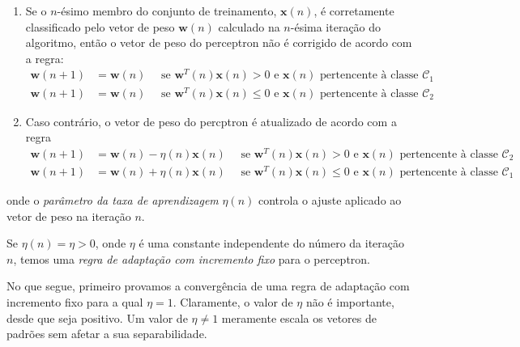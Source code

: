 \begin{enumerate}
  \item Se o $n$-ésimo membro do conjunto de treinamento, $\textbf{x}(n)$, é corretamente classificado pelo vetor de peso $\textbf{w}(n)$ calculado na $n$-ésima iteração do algoritmo, então o vetor de peso do perceptron não é corrigido de acordo com a regra:
  \begin{equation}
    \begin{aligned} \label{sec:perceptron:alg1}
      \textbf{w}(n+1) &= \textbf{w}(n)\quad \text{ se $\textbf{w}^T(n)\textbf{x}(n) > 0 $ e $\textbf{x}(n)$ pertencente à classe  $\mathscr{C}_1$} \\
      \textbf{w}(n+1) &= \textbf{w}(n)\quad \text{ se $\textbf{w}^T(n)\textbf{x}(n) \leq 0 $ e $\textbf{x}(n)$ pertencente à classe  $\mathscr{C}_2$} 
    \end{aligned}
  \end{equation}
  \item Caso contrário, o vetor de peso do percptron é atualizado de acordo com a regra
    \begin{equation}
      \begin{aligned} \label{sec:perceptron:alg2}
        \textbf{w}(n+1) &= \textbf{w}(n) - \eta (n)\textbf{x}(n)\quad \text{ se $\textbf{w}^T(n)\textbf{x}(n) > 0 $ e $\textbf{x}(n)$ pertencente à classe  $\mathscr{C}_2$} \\
        \textbf{w}(n+1) &= \textbf{w}(n) + \eta (n)\textbf{x}(n)\quad \text{ se $\textbf{w}^T(n)\textbf{x}(n) \leq 0 $ e $\textbf{x}(n)$ pertencente à classe  $\mathscr{C}_1$} 
      \end{aligned}
    \end{equation}
\end{enumerate}
onde o \textit{parâmetro da taxa de aprendizagem} $\eta (n)$ controla o ajuste aplicado ao vetor de peso na iteração $n$.

\noindent
Se $\eta(n)=\eta>0$, onde $\eta$ é uma constante independente do número da iteração $n$, temos uma \textit{regra de adaptação com incremento fixo} para o perceptron.

No que segue, primeiro provamos a convergência de uma regra de adaptação com incremento fixo para a qual $\eta=1$. Claramente, o valor de $\eta$ não é importante, desde que seja positivo. Um valor de $\eta \neq 1$ meramente escala os vetores de padrões sem afetar a sua separabilidade.

